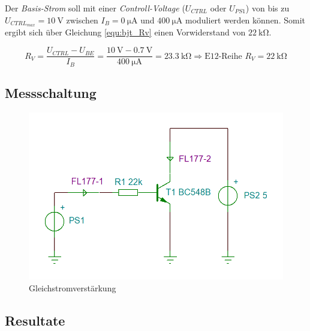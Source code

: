 \documentclass[../main.tex]{subfiles}
\begin{document}
Der \textit{Basis-Strom} soll mit einer \textit{Controll-Voltage} ($U_{CTRL}$ oder $U_{PS1}$) von bis zu $U_{CTRL_{max}} = \SI{10}{\volt}$ zwischen $I_B = \SI{0}{\micro\ampere}$ und $\SI{400}{\micro\ampere}$ moduliert werden können. Somit ergibt sich über Gleichung \ref{equ:bjt_Rv} einen Vorwiderstand von $\SI{22}{\kilo\ohm}$.

\begin{equation}
    R_{V} = \frac{U_{CTRL} - U_{BE}}{I_{B}} = \frac{\SI{10}{\volt} - \SI{0.7}{\volt}}{\SI{400}{\micro\ampere}} = \SI{23.3}{\kilo\ohm} \Rightarrow \textrm{E12-Reihe } R_{V} = \SI{22}{\kilo\ohm}
    \label{equ:bjt_Rv}
\end{equation}

\subsection{Messschaltung}

\begin{figure}[h]
    \centering
    \includegraphics[scale=0.35]{assets/task1_DC_amplification/messschaltung_task1.PNG}
    \caption{Gleichstromverstärkung}
    \label{fig:circuit_dc_amplification}
\end{figure}

\subsection{Resultate}
\end{document}
